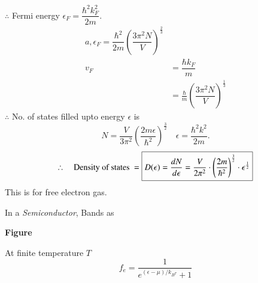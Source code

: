 $\therefore$ Fermi energy $\epsilon_{F}=\dfrac{\hbar^{2}k^{2}_{F}}{2m}$.
\begin{align*}
a, \epsilon_{F}=\dfrac{\hbar^{2}}{2m}\left(\dfrac{3\pi^{2}N}{V}\right)^{\frac{2}{3}}\\
v_{F} &= \dfrac{\hbar k_{F}}{m}\\
&= \frac{\hbar}{m}\left(\dfrac{3\pi^{2}N}{V}\right)^{\frac{1}{3}}
\end{align*}
$\therefore$ No. of states filled upto energy $\epsilon$ is
$$
N=\dfrac{V}{3\pi^{2}}\left(\dfrac{2m\epsilon}{\hbar^{2}}\right)^{\frac{3}{2}}\quad \epsilon=\dfrac{\hbar^{2}k^{2}}{2m}.
$$
$$
\therefore\quad \text{Density of states } = \fbox{$D(\epsilon)=\dfrac{dN}{d\epsilon}=\dfrac{V}{2\pi^{2}}\cdot \left(\dfrac{2m}{\hbar^{2}}\right)^{\frac{3}{2}}\cdot \epsilon^{\frac{1}{2}}$}
$$
This is for free electron gas.

In a {\em Semiconductor}, Bands as
\begin{center}
{\bf Figure}
\end{center}

At finite temperature $T$
$$
f_{e}=\dfrac{1}{e^{(\epsilon-\mu)/k_{B^{T}}}+1}
$$

